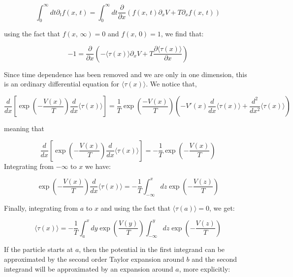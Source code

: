 \begin{equation}
\int_0^{\infty} dt \partial_t f(x, \, t) = \int_0^{\infty} dt \frac{\partial}{\partial x} \left ( f(x, \, t) \partial_x V + T \partial_x f(x, \, t) \right)
\end{equation}

using the fact that $f(x, \, \infty) = 0$ and $f(x, \, 0) = 1$, we find that:

\begin{equation}
-1 = \frac{\partial}{\partial x} \left (-\langle \tau(x) \rangle \partial_x V + T \frac{ \partial \langle \tau(x) \rangle}{\partial x} \right)
\end{equation}

Since time dependence has been removed and we are only in one dimension, this is an ordinary differential equation for $\langle \tau(x) \rangle$. We notice that,

\begin{equation}
\frac{d}{dx} \left [\exp \left (-\frac{V(x)}{T} \right) \frac{d}{dx} \langle \tau(x) \rangle \right] = \frac{1}{T} \exp \left (\frac{-V(x)}{T} \right ) \left (- V'(x) \frac{d}{dx} \langle \tau(x) \rangle + \frac{d^2}{dx^2} \langle \tau(x) \rangle \right)
\end{equation}

meaning that

\begin{equation}
\frac{d}{dx} \left [\exp \left (-\frac{V(x)}{T} \right) \frac{d}{dx} \langle \tau(x) \rangle \right] = -\frac{1}{T} \exp \left(-\frac{V(x)}{T} \right)
\end{equation}
Integrating from $-\infty$ to $x$ we have:

\begin{equation}
\exp \left (-\frac{V(x)}{T} \right) \frac{d}{dx} \langle \tau(x) \rangle = -\frac{1}{T} \int_{-\infty}^x dz \exp \left(-\frac{V(z)}{T} \right)
\end{equation}

Finally, integrating from $a$ to $x$ and using the fact that $\langle \tau(a) \rangle = 0$, we get:

\begin{equation}
\langle \tau(x) \rangle = - \frac{1}{T} \int_a^{x} dy \exp \left(\frac{V(y)}{T} \right) \int_{-\infty}^y dz \exp \left(-\frac{V(z)}{T} \right)
\end{equation}

If the particle starts at $a$, then the potential in the first integrand can be approximated by the second order Taylor expansion around $b$ and the second integrand will be approximated by an expansion around $a$, more explicitly:

